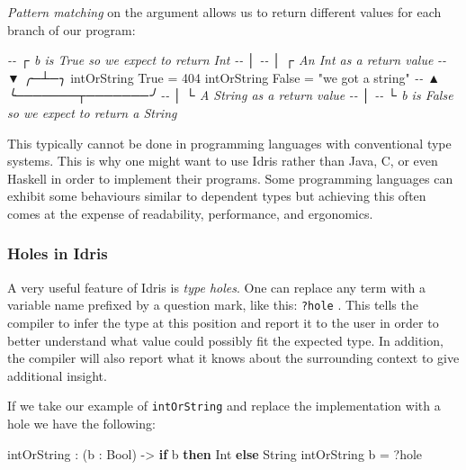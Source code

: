 \documentclass[
]{article}
\newenvironment{Shaded}{}{}
\newcommand{\CommentTok}[1]{\textcolor[rgb]{0.38,0.63,0.69}{\textit{#1}}}
\newcommand{\DataTypeTok}[1]{\textcolor[rgb]{0.56,0.13,0.00}{#1}}
\newcommand{\DecValTok}[1]{\textcolor[rgb]{0.25,0.63,0.44}{#1}}
\newcommand{\KeywordTok}[1]{\textcolor[rgb]{0.00,0.44,0.13}{\textbf{#1}}}
\newcommand{\NormalTok}[1]{#1}
\newcommand{\OperatorTok}[1]{\textcolor[rgb]{0.40,0.40,0.40}{#1}}
\newcommand{\OtherTok}[1]{\textcolor[rgb]{0.00,0.44,0.13}{#1}}
\newcommand{\StringTok}[1]{\textcolor[rgb]{0.25,0.44,0.63}{#1}}
\begin{document}
\emph{Pattern matching} on the argument allows us to return different
values for each branch of our program:

\begin{Shaded}
\begin{Highlighting}[]
\CommentTok{{-}{-}           ┌ \textasciigrave{}b\textasciigrave{} is True so we expect to return \textasciigrave{}Int\textasciigrave{}}
\CommentTok{{-}{-}           │}
\CommentTok{{-}{-}           │      ┌ An Int as a return value}
\CommentTok{{-}{-}           ▼    ╭─┴─╮}
\NormalTok{intOrString }\DataTypeTok{True} \OtherTok{=} \DecValTok{404} 
\NormalTok{intOrString }\DataTypeTok{False} \OtherTok{=} \StringTok{"we got a string"}
\CommentTok{{-}{-}           ▲      ╰───────┬───────╯}
\CommentTok{{-}{-}           │              └ A String as a return value}
\CommentTok{{-}{-}           │}
\CommentTok{{-}{-}           └ \textasciigrave{}b\textasciigrave{} is \textasciigrave{}False\textasciigrave{} so we expect to return a String}
\end{Highlighting}
\end{Shaded}

This typically cannot be done in programming languages with conventional
type systems. This is why one might want to use Idris rather than Java,
C, or even Haskell in order to implement their programs. Some
programming languages can exhibit some behaviours similar to dependent
types but achieving this often comes at the expense of readability,
performance, and ergonomics\cite{hasochism}.

\hypertarget{holes-in-idris}{%
\subsubsection{Holes in Idris}\label{holes-in-idris}}

A very useful feature of Idris is \emph{type holes}. One can replace any
term with a variable name prefixed by a question mark, like this:
\texttt{?hole} . This tells the compiler to infer the type at this
position and report it to the user in order to better understand what
value could possibly fit the expected type. In addition, the compiler
will also report what it knows about the surrounding context to give
additional insight.

If we take our example of \texttt{intOrString} and replace the
implementation with a hole we have the following:

\begin{Shaded}
\begin{Highlighting}[]
\NormalTok{intOrString }\OperatorTok{:}\NormalTok{ (b }\OperatorTok{:} \DataTypeTok{Bool}\NormalTok{) }\OtherTok{{-}\textgreater{}} \KeywordTok{if}\NormalTok{ b }\KeywordTok{then} \DataTypeTok{Int} \KeywordTok{else} \DataTypeTok{String}
\NormalTok{intOrString b }\OtherTok{=} \OperatorTok{?}\NormalTok{hole}
\end{Highlighting}
\end{Shaded}
\end{document}
